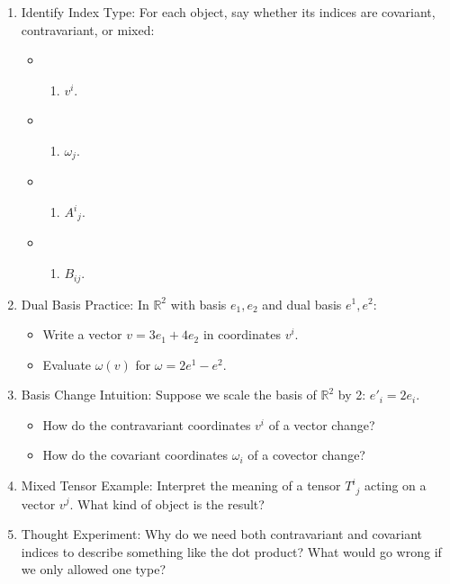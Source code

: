 \documentclass[
  letterpaper,
  DIV=11,
  numbers=noendperiod]{scrreprt}
\providecommand{\tightlist}{%
  \setlength{\itemsep}{0pt}\setlength{\parskip}{0pt}}
\begin{document}
\begin{enumerate}
\def\labelenumi{\arabic{enumi}.}
\item
  Identify Index Type: For each object, say whether its indices are
  covariant, contravariant, or mixed:

  \begin{itemize}
  \tightlist
  \item
    \begin{enumerate}
    \def\labelenumii{(\alph{enumii})}
    \tightlist
    \item
      \(v^i\).
    \end{enumerate}
  \item
    \begin{enumerate}
    \def\labelenumii{(\alph{enumii})}
    \setcounter{enumii}{1}
    \tightlist
    \item
      \(\omega_j\).
    \end{enumerate}
  \item
    \begin{enumerate}
    \def\labelenumii{(\alph{enumii})}
    \setcounter{enumii}{2}
    \tightlist
    \item
      \(A^i{}_j\).
    \end{enumerate}
  \item
    \begin{enumerate}
    \def\labelenumii{(\alph{enumii})}
    \setcounter{enumii}{3}
    \tightlist
    \item
      \(B_{ij}\).
    \end{enumerate}
  \end{itemize}
\item
  Dual Basis Practice: In \(\mathbb{R}^2\) with basis \(e_1, e_2\) and
  dual basis \(e^1, e^2\):

  \begin{itemize}
  \tightlist
  \item
    Write a vector \(v = 3e_1 + 4e_2\) in coordinates \(v^i\).
  \item
    Evaluate \(\omega(v)\) for \(\omega = 2e^1 - e^2\).
  \end{itemize}
\item
  Basis Change Intuition: Suppose we scale the basis of \(\mathbb{R}^2\)
  by 2: \(e'_i = 2 e_i\).

  \begin{itemize}
  \tightlist
  \item
    How do the contravariant coordinates \(v^i\) of a vector change?
  \item
    How do the covariant coordinates \(\omega_i\) of a covector change?
  \end{itemize}
\item
  Mixed Tensor Example: Interpret the meaning of a tensor \(T^i{}_j\)
  acting on a vector \(v^j\). What kind of object is the result?
\item
  Thought Experiment: Why do we need both contravariant and covariant
  indices to describe something like the dot product? What would go
  wrong if we only allowed one type?
\end{enumerate}
\end{document}

